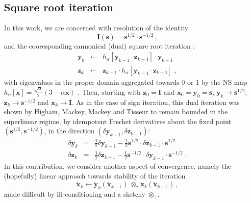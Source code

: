 \documentclass[letterpaper,twocolumn,amsmath,amsfont,amssymb,english,aps,jcp,preprintnumbers,groupaddress,nofootinbib,tightenlines]{revtex4}
\newcommand{\mat}[1]{\boldsymbol{#1}}
\newcommand{\ot}{ {\scriptstyle \otimes}_{ \tau } }
\begin{document}
\subsection{Square root iteration}
In this work, we are concerned with  resolution of the identity \cite{}
\begin{equation}
\mat{I} \left( \mat{s} \right) =\mat{s}^{1/2} \cdot \mat{s}^{-1/2} \, ,
\end{equation}
and the cooresponding cannonical (dual) square root iteration \cite{};
\begin{eqnarray}\label{cannonical}
\mat{y}_k &\leftarrow& h_\alpha \left[ \mat{y}_{k-1} \cdot \mat{z}_{k-1} \right] \cdot \mat{y}_{k-1}  \nonumber \\ 
\mat{z}_k &\leftarrow& \mat{z}_{k-1} \cdot h_\alpha \left[ \mat{y}_{k-1} \cdot \mat{z}_{k-1} \right] \; ,
\end{eqnarray}
with eigenvalues in the proper domain aggregated towards 0 or 1 by the 
NS map $h_\alpha[\mat{x}]=\frac{\sqrt{\alpha}}{2} \left(3-\alpha \mat{x} \right)$  \cite{}. Then,
starting with $\mat{z}_0=\mat{I}$ and $\mat{x}_0=\mat{y}_0=\mat{s}$,
${\mat{y}}_k \rightarrow \mat{s}^{1/2}$, ${\mat{z}}_k \rightarrow \mat{s}^{-1/2}$ and ${\mat{x}}_k \rightarrow {\mat{I}}$.
As in the case of sign iteration, this dual iteration was shown by Higham, Mackey,  Mackey and Tisseur \cite{Higham2005} 
to remain bounded in the superlinear regime, by idempotent Frechet derivatives about the fixed point $\left(\mat{s}^{1/2},\mat{s}^{-1/2}\right)$,
in the direction $\left( \delta \mat{y}_{k-1} , \delta \mat{z}_{k-1} \right)$:
\begin{eqnarray}
\delta \mat{y}_k &=& \frac{1}{2} \delta \mat{y}_{k-1} - \frac{1}{2} \mat{s}^{1/2} \cdot \delta \mat{z}_{k-1} \cdot \mat{s}^{1/2} \\
\delta \mat{z}_k &=& \frac{1}{2} \delta \mat{z}_{k-1} - \frac{1}{2} \mat{s}^{-1/2} \cdot \delta \mat{y}_{k-1} \cdot \mat{s}^{-1/2} \;.
\end{eqnarray}
In this contribution, we consider another aspect of convergence, namely the (hopefully) linear approach towards stability of the iteration 
\begin{equation}
\widetilde{\mat{x}}_k \leftarrow 
 \widetilde{\mat{y}}_k \left( \widetilde{\mat{x}}_{k-1} \right)
\, \ot \, \widetilde{\mat{z}}_k \left( \widetilde{\mat{x}}_{k-1} \right) \, ,
\end{equation}
made difficult by ill-conditioning and a sketchy $\ot$.
\end{document}
